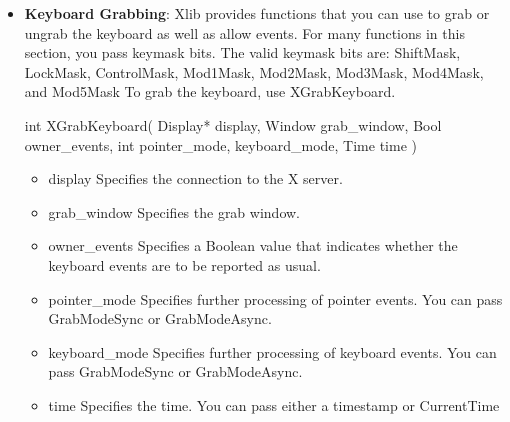 \documentclass{report}
\begin{document}
\begin{itemize}
\begin{itemize}
                \item LockMask	(2)	Caps Lock
                \item ControlMask (4)	Ctrl
                \item Mod1Mask	(8)	Alt / Meta
                \item Mod2Mask	(16)	Num Lock
                \item Mod3Mask	(32)	Scroll Lock / AltGr
                \item Mod4Mask	(64)	Windows Key / Super
                \item Mod5Mask	(128)	AltGr / Scroll Lock
                \item AnyModifier	(32768)	Matches any modifier combination
            \end{itemize}
        \item \textbf{Keyboard Grabbing}: 
            Xlib provides functions that you can use to grab or ungrab the keyboard as well as allow events. For many functions in this section, you pass keymask bits. The valid keymask bits are: ShiftMask, LockMask, ControlMask, Mod1Mask, Mod2Mask, Mod3Mask, Mod4Mask, and Mod5Mask
            \bigbreak \noindent 
            To grab the keyboard, use XGrabKeyboard.
            \bigbreak \noindent 
            \begin{cppcode}
                int XGrabKeyboard(
                    Display* display,
                    Window grab_window,
                    Bool owner_events,
                    int pointer_mode, keyboard_mode,
                    Time time
                )
            \end{cppcode}
            \bigbreak \noindent
            \begin{itemize}
                \item display Specifies the connection to the X server.
                \item grab\_window Specifies the grab window.
                \item owner\_events Specifies a Boolean value that indicates whether the keyboard events are to be reported as usual.
                \item pointer\_mode Specifies further processing of pointer events. You can pass GrabModeSync or GrabModeAsync.
                \item keyboard\_mode Specifies further processing of keyboard events. You can pass GrabModeSync or GrabModeAsync.
                \item time Specifies the time. You can pass either a timestamp or CurrentTime

\end{itemize}
\end{itemize}
\end{document}
